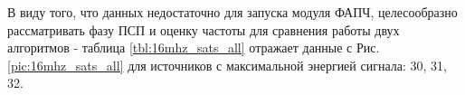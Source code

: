 В виду того, что данных недостаточно для запуска модуля ФАПЧ, целесообразно рассматривать фазу ПСП и оценку частоты для сравнения работы двух
алгоритмов - таблица \ref{tbl:16mhz_sats_all} отражает данные с Рис. \ref{pic:16mhz_sats_all} для источников с максимальной энергией сигнала: 30, 31, 32.
